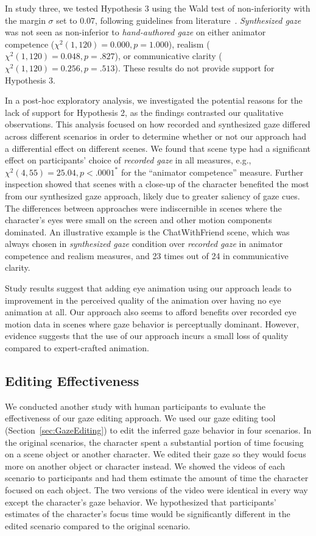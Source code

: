 In study three, we tested Hypothesis 3 using the Wald test of non-inferiority with the margin $\sigma$ set to 0.07, following guidelines from literature~\citep{ng2001choice}.
\emph{Synthesized gaze} was not seen as non-inferior to \emph{hand-authored gaze} on either animator competence ($\chi^2(1, 120) = 0.000, p = 1.000$), realism ($\chi^2(1, 120) = 0.048, p = .827$), or communicative clarity ($\chi^2(1, 120) = 0.256, p = .513$). These results do not provide support for Hypothesis 3.

In a post-hoc exploratory analysis, we investigated the potential reasons for the lack of support for Hypothesis 2, as the findings contrasted our qualitative observations. This analysis focused on how recorded and synthesized gaze differed across different scenarios in order to determine whether or not our approach had a differential effect on different scenes. We found that scene type had a significant effect on participants' choice of \emph{recorded gaze} in all measures, e.g., $\chi^2(4, 55) = 25.04, p < .0001^*$ for the ``animator competence'' measure. Further inspection showed that scenes with a close-up of the character benefited the most from our synthesized gaze approach, likely due to greater saliency of gaze cues. The differences between approaches were indiscernible in scenes where the character's eyes were small on the screen and other motion components dominated. An illustrative example is the ChatWithFriend scene, which was always chosen in \emph{synthesized gaze} condition over \emph{recorded gaze} in animator competence and realism measures, and 23 times out of 24 in communicative clarity.

Study results suggest that adding eye animation using our approach leads to improvement in the perceived quality of the animation over having no eye animation at all. Our approach also seems to afford benefits over recorded eye motion data in scenes where gaze behavior is perceptually dominant. However, evidence suggests that the use of our approach incurs a small loss of quality compared to expert-crafted animation.

\subsection{Editing Effectiveness}
\label{sec:GazeEditingEffectEvaluation}

We conducted another study with human participants to evaluate the effectiveness of our gaze editing approach. We used our gaze editing tool (Section~\ref{sec:GazeEditing}) to edit the inferred gaze behavior in four scenarios. In the original scenarios, the character spent a substantial portion of time focusing on a scene object or another character. We edited their gaze so they would focus more on another object or character instead. We showed the videos of each scenario to participants and had them estimate the amount of time the character focused on each object. The two versions of the video were identical in every way except the character's gaze behavior. We hypothesized that participants' estimates of the character's focus time would be significantly different in the edited scenario compared to the original scenario.

